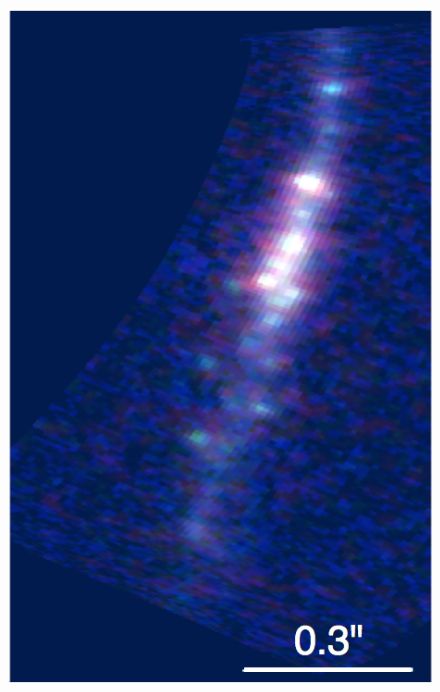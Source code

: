\begin{figure}
\centering
\includegraphics[height=0.4\textheight]{Chap6/candelized_highres.png}

\end{figure}
